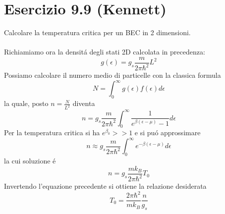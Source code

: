 \documentclass[a4paper]{article}
\begin{document}
    \section*{Esercizio 9.9 (Kennett)}
        Calcolare la temperatura critica per un BEC in 2 dimensioni.
        \\
        \\
        Richiamiamo ora la densit\'a degli stati 2D calcolata in precedenza:
        \begin{equation*}
            g(\epsilon)=g_s\frac{m}{2\pi\hbar^2}L^2
        \end{equation*}
        Possiamo calcolare il numero medio di particelle con la classica formula
        \begin{equation*}
            N=\int_0^\infty g(\epsilon)f(\epsilon)d\epsilon
        \end{equation*}
        la quale, posto $n=\frac{N}{L^2}$ diventa
        \begin{equation*}
            n=g_s\frac{m}{2\pi\hbar^2}\int_0^\infty \frac{1}{e^{\beta(\epsilon-\mu)}-1}d\epsilon
        \end{equation*}
        Per la temperatura critica si ha $e^{\beta_0}>>1$ e si pu\'o approssimare
        \begin{equation*}
            n\approx g_s\frac{m}{2\pi\hbar^2}\int_0^\infty e^{-\beta(\epsilon-\mu)}d\epsilon
        \end{equation*}
        la cui soluzione \'e
        \begin{equation*}
            n=g_s\frac{mk_B}{2\pi\hbar^2}T_0
        \end{equation*}
        Invertendo l'equazione precedente si ottiene la relazione desiderata
        \begin{equation*}
            T_0=\frac{2\pi\hbar^2}{mk_B}\frac{n}{g_s}
        \end{equation*}
\end{document}
